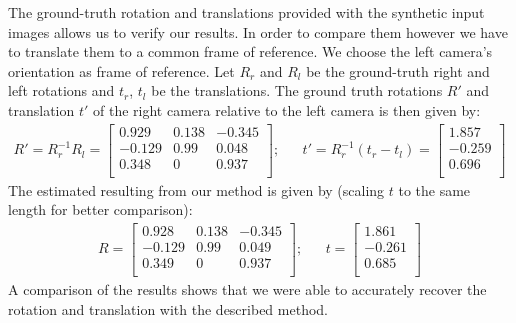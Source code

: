 \documentclass{paper}
\begin{document}
The ground-truth rotation and translations provided with the synthetic input images allows us to verify our results. In order to compare them however we have to translate them to a common frame of reference. We choose the left camera's orientation as frame of reference. Let $R_r$ and $R_l$ be the ground-truth right and left rotations and $t_r$, $t_l$ be the translations. The ground truth rotations $R'$ and translation $t'$ of the right camera relative to the left camera is then given by:
\begin{align}
R' = R_r^{-1}R_l = \left[ \begin{array}{ccc}
0.929 & 0.138 & -0.345 \\
-0.129 & 0.99 & 0.048 \\
0.348 & 0 & 0.937 \\
\end{array} \right]; \nonumber 
&& t'= R_r^{-1}(t_r-t_l) = \left[ \begin{array}{c}
1.857\\
-0.259 \\
0.696 \\
\end{array} \right] \nonumber 
\end{align}
The estimated resulting from our method is given by (scaling $t$ to the same length for better comparison):
\begin{align}
R = \left[ \begin{array}{ccc}
0.928 & 0.138 & -0.345 \\
-0.129 & 0.99 & 0.049 \\
0.349 & 0 & 0.937 \\
\end{array} \right]; \nonumber 
&& t= \left[ \begin{array}{c}
1.861\\
-0.261 \\
0.685 \\
\end{array} \right] \nonumber 
\end{align}
A comparison of the results shows that we were able to accurately recover the rotation and translation with the described method.
\end{document}
